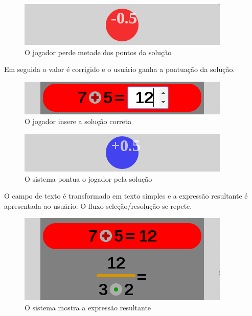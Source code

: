 \begin{figure}[H]
	\caption{\label{miss_0_5_2}O jogador perde metade dos pontos da solução}
	\begin{center}
	    \includegraphics[scale=1]{miss_0_5.png}
	\end{center}
\end{figure}

Em seguida o valor é corrigido e o usuário ganha a pontuação da solução.

\begin{figure}[H]
	\caption{\label{xp_4}O jogador insere a solução correta}
	\begin{center}
	    \includegraphics[scale=1]{xp_4_4_rightans_1.png}
	\end{center}
\end{figure}

\begin{figure}[H]
	\caption{\label{score_0_5_2}O sistema pontua o jogador pela solução}
	\begin{center}
	    \includegraphics[scale=1]{score_0_5.png}
	\end{center}
\end{figure}

O campo de texto é transformado em texto simples e a expressão resultante é apresentada ao usuário. O fluxo seleção/resolução se repete.

\begin{figure}[H]
	\caption{\label{xp_5}O sistema mostra a expressão resultante}
	\begin{center}
	    \includegraphics[scale=1]{xp_4_5.png}
	\end{center}
\end{figure}

